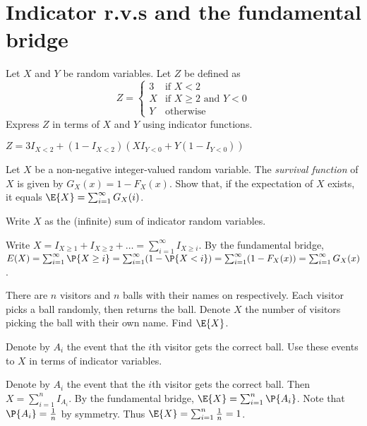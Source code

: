 \section{Indicator r.v.s and the fundamental bridge}
\label{sec:section-4.3}

\begin{exercise}
	Let $X$ and $Y$ be random variables. Let $Z$ be defined as
	\begin{equation}
		Z =
		\begin{cases}
			3 & \text{if } X < 2 \\
			X & \text{if } X \geq 2 \text{ and } Y < 0 \\
			Y & \text{otherwise}
		\end{cases}
	\end{equation}
	Express $Z$ in terms of $X$ and $Y$ using indicator functions.
	\begin{solution}
		$Z = 3 I_{X < 2} + (1 - I_{X < 2})(X I_{Y < 0} + Y (1 - I_{Y < 0}))$
	\end{solution}
\end{exercise}

\begin{exercise}
	Let $X$ be a non-negative integer-valued random variable. The \emph{survival function} of $X$ is given by $G_X(x) = 1 - F_X(x)$. Show that, if the expectation of $X$ exists, it equals $\E{X} = \sum_{i = 1}^{\infty} G_X(i)$.
	\begin{hint}
		Write $X$ as the (infinite) sum of indicator random variables.
	\end{hint}
	\begin{solution}
		Write $X = I_{X \geq 1} + I_{X \geq 2} + \hdots = \sum_{i = 1}^{\infty} I_{X \geq i}$. By the fundamental bridge, $E(X) = \sum_{i = 1}^{\infty} \P{X \geq i} = \sum_{i = 1}^{\infty} (1 - \P{X < i}) = \sum_{i = 1}^{\infty} (1 - F_X(x)) = \sum_{i = 1}^{\infty} G_X(x)$.
	\end{solution}
\end{exercise}

\begin{exercise}
	There are $n$ visitors and $n$ balls with their names on respectively. Each visitor picks a ball randomly, then returns the ball. Denote $X$ the number of visitors picking the ball with their own name. Find $\E{X}$.
	\begin{hint}
		Denote by $A_i$ the event that the $i$th visitor gets the correct ball. Use these events to $X$ in terms of indicator variables.
	\end{hint}
	\begin{solution}
		Denote by $A_i$ the event that the $i$th visitor gets the correct ball. Then $X = \sum_{i = 1}^n I_{A_i}$. By the fundamental bridge, $\E{X} = \sum_{i = 1}^n \P{A_i}$. Note that $\P{A_i} = \frac{1}{n}$ by symmetry. Thus $\E{X} = \sum_{i = 1}^n \frac{1}{n} = 1$.
	\end{solution}
\end{exercise}

